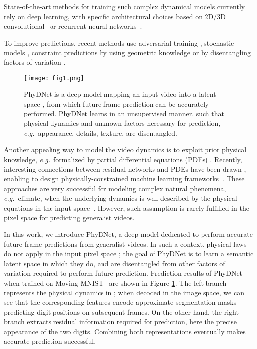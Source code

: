 \documentclass[10pt,twocolumn,letterpaper]{article}
\def\eg{\textit{e.g.}~}
\begin{document}
State-of-the-art methods for training such complex dynamical models currently rely on deep learning, with specific architectural choices based on 2D/3D convolutional~\cite{mathieu2015deep,vondrick2016generating} or recurrent neural networks~\cite{wang2017predrnn,wang2018predrnn++,wang2019memory}. 

To improve predictions, recent methods use adversarial training \cite{mathieu2015deep,vondrick2016generating,kwon2019predicting}, stochastic models \cite{castrejon2019improved,minderer2019unsupervised}, constraint predictions by using geometric knowledge \cite{finn2016unsupervised,jia2016dynamic,xue2016visual} or by disentangling factors of variation \cite{villegas2017decomposing,tulyakov2018mocogan,denton2017unsupervised,hsieh2018learning}.

\begin{figure}
    \centering
    \texttt{[image: fig1.png]}
        \caption{PhyDNet is a deep model mapping an input video into a latent space , from which future frame prediction can be accurately performed. PhyDNet learns  in an unsupervised manner, such that physical dynamics and unknown factors necessary for prediction, \eg appearance, details, texture, are disentangled. \vspace{-0.1cm}} 
    \label{fig:fig1}
\end{figure}

Another appealing way to model the video dynamics is to exploit prior physical knowledge, \eg formalized by partial differential equations (PDEs) \cite{de2017deep,seo2019differentiable}. Recently, interesting connections between residual networks and PDEs have been drawn \cite{weinan2017proposal,lu2018beyond,chen2018neural}, enabling to design physically-constrained machine learning frameworks~\cite{raissi2018deep,de2017deep,seo2019differentiable,rudy2017data}. 
These approaches are very successful for modeling complex natural phenomena, \eg climate, when the underlying dynamics is well described by the physical equations in the input space~\cite{raissi2018deep,rudy2017data,long2018pde}. However, such assumption is rarely fulfilled in the pixel space for predicting generalist videos.
  
 In this work,  we introduce PhyDNet, a deep model dedicated to perform accurate future frame predictions from generalist videos. In such a context, physical laws do not apply in the input pixel space ; the goal of PhyDNet is to learn a semantic latent space  in which they do, and are disentangled from other factors of variation required to perform future prediction.
Prediction results of PhyDNet when trained on Moving MNIST~\cite{srivastava2015unsupervised} are shown in Figure \ref{fig:fig1}. The left branch represents the physical dynamics in  ; when decoded in the image space, we can see that the corresponding features encode approximate segmentation masks predicting digit positions on subsequent frames. 
  On the other hand, the right branch extracts residual information required for prediction, here the precise appearance of the two digits. Combining both representations eventually makes accurate prediction successful.
  
\end{document}

